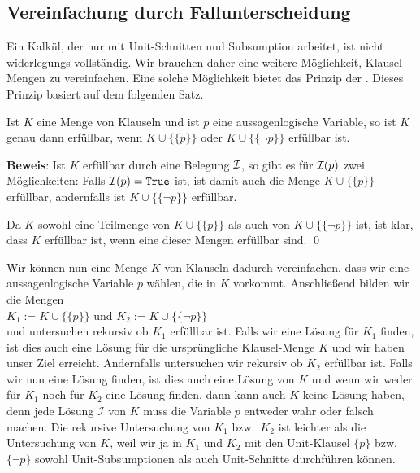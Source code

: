 \subsection{Vereinfachung durch Fallunterscheidung}
Ein Kalkül, der nur mit Unit-Schnitten und Subsumption arbeitet, ist nicht 
widerlegungs-vollständig.  Wir brauchen 
daher eine weitere Möglichkeit, Klausel-Mengen zu vereinfachen.
Eine solche Möglichkeit bietet das Prinzip der
.  Dieses Prinzip basiert auf dem folgenden
Satz.

\begin{Satz}
  Ist $K$ eine Menge von Klauseln und ist $p$ eine aussagenlogische Variable, 
  so ist $K$ genau dann erfüllbar, wenn $K \cup \bigl\{\{p\}\bigr\}$ oder 
  $K \cup \bigl\{\{\neg p\}\bigr\}$ erfüllbar ist.  
\end{Satz}

\noindent
\textbf{Beweis}: 
Ist $K$ erfüllbar durch eine
Belegung $\mathcal{I}$, so gibt es für  $\mathcal{I}(p)$ zwei Möglichkeiten:  Falls $\mathcal{I}(p) = \texttt{True}$ ist, ist
damit auch die Menge $K \cup \bigl\{\{p\}\bigr\}$ erfüllbar, andernfalls ist
$K \cup \bigl\{\{\neg p\}\bigr\}$ erfüllbar. 

Da $K$ sowohl eine Teilmenge von $K \cup \bigl\{\{p\}\bigr\}$ als auch von 
$K \cup \bigl\{\{\neg p\}\bigr\}$ ist, ist klar, dass $K$ erfüllbar
ist, wenn eine dieser Mengen erfüllbar sind.  
\qed

Wir können nun eine Menge $K$ von Klauseln dadurch vereinfachen, dass wir eine
aussagenlogische Variable $p$ wählen, die in $K$ vorkommt.
Anschließend bilden wir die Mengen \\[0.2cm]
\hspace*{1.3cm} $K_1 := K \cup \bigl\{\{p\}\bigr\}$ \quad und \quad $K_2 := K \cup
\bigl\{\{\neg p\}\bigr\}$
\\[0.2cm]
und untersuchen rekursiv ob $K_1$ erfüllbar ist.  Falls wir eine Lösung für $K_1$ finden,
ist dies auch eine Lösung für die ursprüngliche Klausel-Menge $K$ und wir haben unser Ziel
erreicht.
Andernfalls untersuchen wir rekursiv ob $K_2$ erfüllbar ist.
Falls wir nun eine Lösung finden, ist dies auch eine Lösung von $K$ und wenn wir weder
für $K_1$ noch für $K_2$ eine Lösung finden, dann kann auch $K$ keine Lösung haben,
denn jede Lösung $\mathcal{I}$ von $K$ muss die Variable $p$ entweder wahr oder falsch machen.
Die rekursive Untersuchung von $K_1$ bzw.~$K_2$ ist leichter als die Untersuchung von $K$,
weil wir ja in $K_1$ und $K_2$ mit den Unit-Klausel $\{p\}$ bzw.~$\{\neg p\}$
sowohl Unit-Subsumptionen als auch Unit-Schnitte durchführen können.


